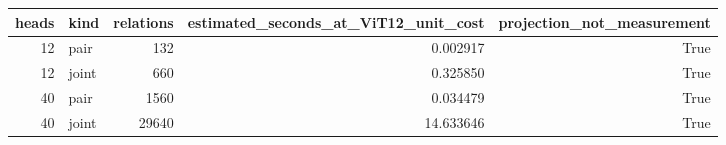 \begin{tabular}{rlrrr}
\toprule
heads & kind & relations & estimated_seconds_at_ViT12_unit_cost & projection_not_measurement \\
\midrule
12 & pair & 132 & 0.002917 & True \\
12 & joint & 660 & 0.325850 & True \\
40 & pair & 1560 & 0.034479 & True \\
40 & joint & 29640 & 14.633646 & True \\
\bottomrule
\end{tabular}
